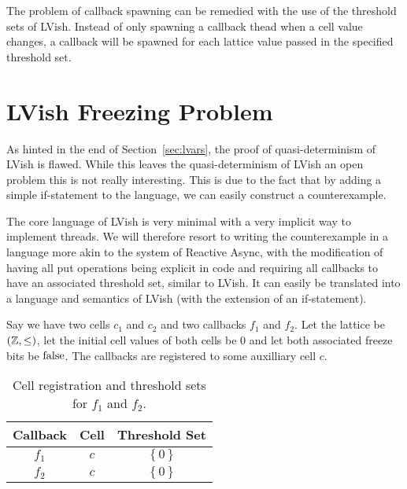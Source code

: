 The problem of callback spawning can be remedied with the use of the threshold
sets of LVish. Instead of only spawning a callback thead when a cell value
changes, a callback will be spawned for each lattice value passed in the
specified threshold set.



\section{LVish Freezing Problem}%
\label{sec:a_problem_of_lvish}

As hinted in the end of Section~\ref{sec:lvars}, the proof of quasi-determinism
of LVish is flawed. While this leaves the quasi-determinism of LVish an open
problem this is not really interesting. This is due to the fact that by adding a
simple if-statement to the language, we can easily construct a counterexample.

The core language of LVish is very minimal with a very implicit way to implement
threads. We will therefore resort to writing the counterexample in a language
more akin to the system of Reactive Async, with the modification of having all
put operations being explicit in code and requiring all callbacks to have an
associated threshold set, similar to LVish. It can easily be translated into a
language and semantics of LVish (with the extension of an if-statement).

Say we have two cells $c_1$ and $c_2$ and two callbacks $f_1$ and $f_2$. Let the
lattice be $(\mathbb{Z}, \leq)$, let the initial cell values of both cells be 
$0$ and let both associated freeze bits be $\mathrm{false}$. The
callbacks are registered to some auxilliary cell $c$. 

\begin{table}
  \centering
  \begin{tabular}{c|c|c}
    Callback & Cell & Threshold Set \\
    \hline
    $f_1$ & $c$ & $\left\{ 0 \right\}$ \\
    $f_2$ & $c$ & $\left\{ 0 \right\}$ \\
  \end{tabular}
  \caption{Cell registration and threshold sets for $f_1$ and $f_2$.}
  \label{tab:cellreg}
\end{table}

